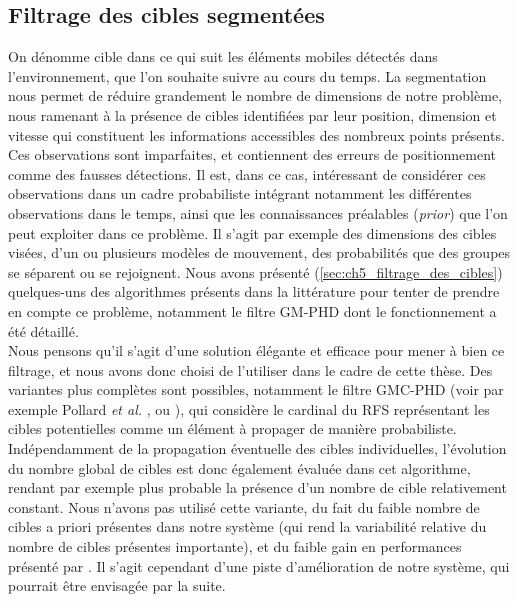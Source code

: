 \subsection{Filtrage des cibles segmentées}
On dénomme \og cible\fg{} dans ce qui suit les éléments mobiles détectés dans l'environnement, que l'on souhaite suivre au cours du temps. La segmentation nous permet de réduire grandement le nombre de dimensions de notre problème, nous ramenant à la présence de cibles identifiées par leur position, dimension et vitesse qui constituent les informations accessibles des nombreux points présents.\\
Ces observations sont imparfaites, et contiennent des erreurs de positionnement comme des fausses détections. Il est, dans ce cas, intéressant de considérer ces observations dans un cadre probabiliste intégrant notamment les différentes observations dans le temps, ainsi que les connaissances préalables (\emph{prior}) que l'on peut exploiter dans ce problème. Il s'agit par exemple des dimensions des cibles visées, d'un ou plusieurs modèles de mouvement, des probabilités que des groupes se séparent ou se rejoignent. Nous avons présenté (\ref{sec:ch5_filtrage_des_cibles}) quelques-uns des algorithmes présents dans la littérature pour tenter de prendre en compte ce problème, notamment le filtre GM-PHD dont le fonctionnement a été détaillé.\\

Nous pensons qu'il s'agit d'une solution élégante et efficace pour mener à bien ce filtrage, et nous avons donc choisi de l'utiliser dans le cadre de cette thèse. Des variantes plus complètes sont possibles, notamment le filtre GMC-PHD (voir par exemple Pollard \textit{et al.} \cite{Pollard2009a}, ou \cite{Ulmke}), qui considère le cardinal du RFS représentant les cibles potentielles comme un élément à propager de manière probabiliste. Indépendamment de la propagation éventuelle des cibles individuelles, l'évolution du nombre global de cibles est donc également évaluée dans cet algorithme, rendant par exemple plus probable la présence d'un nombre de cible relativement constant. Nous n'avons pas utilisé cette variante, du fait du faible nombre de cibles a priori présentes dans notre système (qui rend la variabilité relative du nombre de cibles présentes importante), et du faible gain en performances présenté par \cite{Pollard2009a}. Il s'agit cependant d'une piste d'amélioration de notre système, qui pourrait être envisagée par la suite. \\

